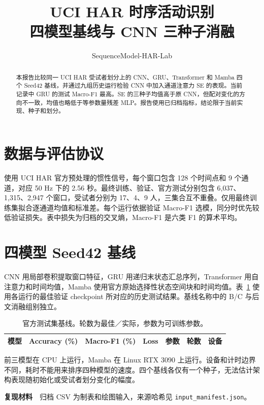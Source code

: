 \documentclass[UTF8,a4paper,11pt,fontset=none]{ctexart}
\title{\textbf{UCI HAR 时序活动识别}\\[4pt]\large 四模型基线与 CNN 三种子消融}
\author{SequenceModel-HAR-Lab}
\date{\ReportEdition}
\providecommand{\ReportAssets}{}
\begin{document}
\maketitle

\begin{abstract}
本报告比较同一 UCI HAR 受试者划分上的 CNN、GRU、Transformer 和 Mamba 四个 Seed42 基线，并通过九组历史运行检验 CNN 中加入通道注意力 SE 的表现。当前记录中 GRU 的测试 Macro-F1 最高。SE 的三种子均值高于原 CNN，但配对变化的方向不一致，均值也略低于等参数量残差 MLP。报告使用已归档指标，结论限于当前实现、种子和划分。
\end{abstract}

\section{数据与评估协议}
使用 UCI HAR 官方预处理的惯性信号，每个窗口包含 128 个时间点和 9 个通道，对应 50 Hz 下的 2.56 秒。最终训练、验证、官方测试分别包含 6,037、1,315、2,947 个窗口，受试者分别为 17、4、9 人，三集合互不重叠。仅用最终训练集拟合逐通道均值和标准差。每个运行依据验证 Macro-F1 选模，同分时优先较低验证损失。表中损失为归档的交叉熵，Macro-F1 是六类 F1 的算术平均。

\section{四模型 Seed42 基线}
CNN 用局部卷积提取窗口特征，GRU 用递归末状态汇总序列，Transformer 用自注意力和时间均值，Mamba 使用官方原始选择性状态空间块和时间均值。表~\ref{tab:baselines} 使用各运行的最佳验证 checkpoint 所对应的历史测试结果。基线名称中的 B/C 与后文消融组别独立。

\begin{table}[ht!]
\centering
\caption{官方测试集基线。轮数为最佳／实际，参数为可训练参数。}
\label{tab:baselines}
\small
\begin{tabular}{lrrrrrl}
\toprule
模型 & Accuracy (\%) & Macro-F1 (\%) & Loss & 参数 & 轮数 & 设备 \\
\midrule

\end{tabular}
\end{table}

前三模型在 CPU 上运行，Mamba 在 Linux RTX 3090 上运行。设备和计时边界不同，耗时不能用来排序四种模型的速度。四个基线各仅有一个种子，无法估计架构表现随初始化或受试者划分变化的幅度。

\noindent\textbf{复现材料}　归档 CSV 为制表和绘图输入，来源哈希见 \texttt{input\_manifest.json}。
\end{document}
